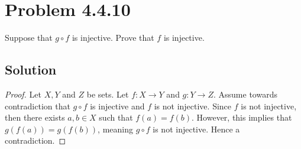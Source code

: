 \documentclass[12pt]{extarticle}
\begin{document}
\section*{Problem 4.4.10}

Suppose that $g \circ f$ is injective. Prove that $f$ is injective.

\subsection*{Solution}


\begin{proof}
	Let $X, Y$ and $Z$ be sets. Let $f : X \rightarrow Y$ and $g : Y \rightarrow Z$. Assume towards contradiction that $g \circ f$ is injective and $f$ is not injective. Since $f$ is not injective, then there exists $a,b \in X$ such that $f(a) = f(b)$. However, this implies that $g(f(a)) = g(f(b))$, meaning $g \circ f$ is not injective. Hence a contradiction.
\end{proof}
\end{document}
